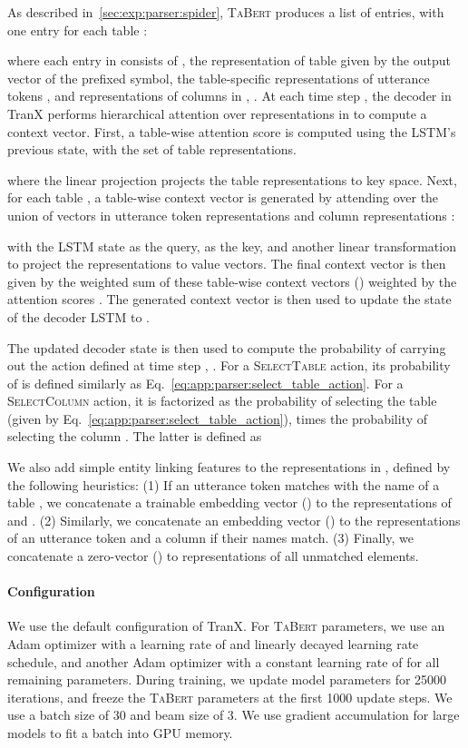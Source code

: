 \documentclass[11pt,a4paper]{article}
\def\model/{\textsc{TaBert}}
\renewcommand{\tt}[1]{\fontfamily{cmtt}\selectfont #1}
\begin{document}
As described in~\autoref{sec:exp:parser:spider}, \model/ produces a list of entries, with one entry  for each table : 

where each entry  in  
consists of , the representation of table  given by the output vector of the prefixed {\tt [CLS]} symbol, the table-specific representations of utterance tokens , 
and representations of columns in , . 
At each time step , the decoder in TranX performs hierarchical attention over representations in  to compute a context vector.
First, a table-wise attention score is computed using the LSTM's previous state,  with the set of table representations.

where the linear projection  projects the table representations to key space. Next, for each table , a table-wise context vector  is generated by attending over the union of vectors in utterance token representations  and column representations :

with the LSTM state as the query,  as the key, and another linear transformation  to project the representations to value vectors. 
The final context vector is then given by the weighted sum of these table-wise context vectors  () weighted by the attention scores . The generated context vector is then used to update the state of the decoder LSTM to .

The updated decoder state is then used to compute the probability of carrying out the action defined at time step , .
For a \textsc{SelectTable} action, its probability of is defined similarly as Eq.~\eqref{eq:app:parser:select_table_action}.
For a \textsc{SelectColumn} action, it is factorized as the probability of selecting the table  (given by Eq.~\eqref{eq:app:parser:select_table_action}), times the probability of selecting the column . The latter is defined as


We also add simple entity linking features to the representations in , defined by the following heuristics: 
(1) If an utterance token  matches with the name of a table , we concatenate a trainable embedding vector () to the representations of  and .
(2) Similarly, we concatenate an embedding vector () to the representations of an utterance token and a column if their names match.
(3) Finally, we concatenate a zero-vector () to representations of all unmatched elements.

\paragraph{Configuration} We use the default configuration of TranX. For \model/ parameters, we use an Adam optimizer with a learning rate of  and linearly decayed learning rate schedule, and another Adam optimizer with a constant learning rate of  for all remaining parameters. 
During training, we update model parameters for 25000 iterations, and freeze the \model/ parameters at the first 1000 update steps. We use a batch size of 30 and beam size of 3. 
We use gradient accumulation for large models to fit a batch into GPU memory.
\end{document}
